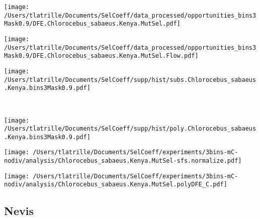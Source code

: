 \documentclass{article}
\begin{document}
    \begin{minipage}{0.32\linewidth}
        \texttt{[image: /Users/tlatrille/Documents/SelCoeff/data\_processed/opportunities\_bins3Mask0.9/DFE.Chlorocebus\_sabaeus.Kenya.MutSel.pdf]}
    \end{minipage}
    \begin{minipage}{0.32\linewidth}
        \texttt{[image: /Users/tlatrille/Documents/SelCoeff/data\_processed/opportunities\_bins3Mask0.9/DFE.Chlorocebus\_sabaeus.Kenya.MutSel.Flow.pdf]}
    \end{minipage}
    \begin{minipage}{0.32\linewidth}
        \texttt{[image: /Users/tlatrille/Documents/SelCoeff/supp/hist/subs.Chlorocebus\_sabaeus.Kenya.bins3Mask0.9.pdf]}
    \end{minipage}
    \\
    \begin{minipage}{0.32\linewidth}
        \texttt{[image: /Users/tlatrille/Documents/SelCoeff/supp/hist/poly.Chlorocebus\_sabaeus.Kenya.bins3Mask0.9.pdf]}
    \end{minipage}
    \begin{minipage}{0.32\linewidth}
        \texttt{[image: /Users/tlatrille/Documents/SelCoeff/experiments/3bins-mC-nodiv/analysis/Chlorocebus\_sabaeus.Kenya.MutSel-sfs.normalize.pdf]}
    \end{minipage}
    \begin{minipage}{0.32\linewidth}
        \texttt{[image: /Users/tlatrille/Documents/SelCoeff/experiments/3bins-mC-nodiv/analysis/Chlorocebus\_sabaeus.Kenya.MutSel.polyDFE\_C.pdf]}
    \end{minipage}
    \subsection{Nevis}
\end{document}
